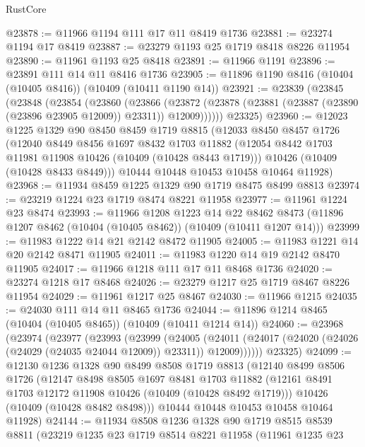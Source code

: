 \begin{lexlean}{RustCore}
\begin{coremodule}
@23878 := @11966 @1194 @111 @17 @11 @8419 @1736
@23881 := @23274 @1194 @17 @8419
@23887 := @23279 @1193 @25 @1719 @8418 @8226 @11954
@23890 := @11961 @1193 @25 @8418
@23891 := @11966 @1191
@23896 := @23891 @111 @14 @11 @8416 @1736
@23905 := @11896 @1190 @8416 (@10404 (@10405 @8416)) (@10409 (@10411 @1190 @14))
@23921 := @23839
    (@23845
      (@23848
        (@23854
          (@23860
            (@23866
              (@23872 (@23878 (@23881 (@23887 (@23890 (@23896 @23905 @12009)) @23311)) @12009))))))
      @23325)
@23960 := @12023
    @1225
    @1329
    @90
    @8450
    @8459
    @1719
    @8815
    (@12033
      @8450
      @8457
      @1726
      (@12040
        @8449
        @8456
        @1697
        @8432
        @1703
        @11882
        (@12054 @8442 @1703 @11981 @11908 @10426 (@10409 (@10428 @8443 @1719)))
        @10426
        (@10409 (@10428 @8433 @8449)))
      @10444
      @10448
      @10453
      @10458
      @10464
      @11928)
@23968 := @11934 @8459 @1225 @1329 @90 @1719 @8475 @8499 @8813
@23974 := @23219 @1224 @23 @1719 @8474 @8221 @11958
@23977 := @11961 @1224 @23 @8474
@23993 := @11966
    @1208
    @1223
    @14
    @22
    @8462
    @8473
    (@11896 @1207 @8462 (@10404 (@10405 @8462)) (@10409 (@10411 @1207 @14)))
@23999 := @11983 @1222 @14 @21 @2142 @8472 @11905
@24005 := @11983 @1221 @14 @20 @2142 @8471 @11905
@24011 := @11983 @1220 @14 @19 @2142 @8470 @11905
@24017 := @11966 @1218 @111 @17 @11 @8468 @1736
@24020 := @23274 @1218 @17 @8468
@24026 := @23279 @1217 @25 @1719 @8467 @8226 @11954
@24029 := @11961 @1217 @25 @8467
@24030 := @11966 @1215
@24035 := @24030 @111 @14 @11 @8465 @1736
@24044 := @11896 @1214 @8465 (@10404 (@10405 @8465)) (@10409 (@10411 @1214 @14))
@24060 := @23968
    (@23974
      (@23977
        (@23993
          (@23999
            (@24005
              (@24011 (@24017 (@24020 (@24026 (@24029 (@24035 @24044 @12009)) @23311)) @12009))))))
      @23325)
@24099 := @12130
    @1236
    @1328
    @90
    @8499
    @8508
    @1719
    @8813
    (@12140
      @8499
      @8506
      @1726
      (@12147
        @8498
        @8505
        @1697
        @8481
        @1703
        @11882
        (@12161 @8491 @1703 @12172 @11908 @10426 (@10409 (@10428 @8492 @1719)))
        @10426
        (@10409 (@10428 @8482 @8498)))
      @10444
      @10448
      @10453
      @10458
      @10464
      @11928)
@24144 := @11934
    @8508
    @1236
    @1328
    @90
    @1719
    @8515
    @8539
    @8811
    (@23219
      @1235
      @23
      @1719
      @8514
      @8221
      @11958
      (@11961
        @1235
        @23

\end{coremodule}
\end{lexlean}
